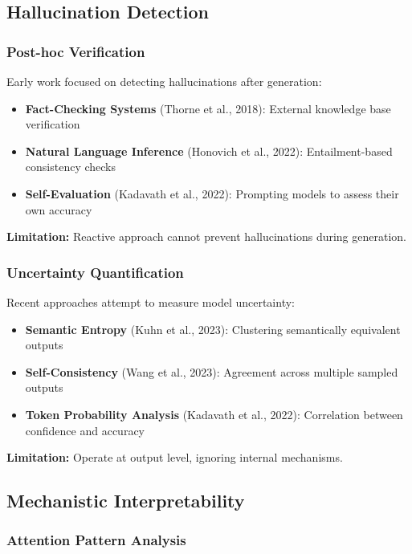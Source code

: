 \documentclass[11pt]{article}
\begin{document}
\subsection{Hallucination Detection}

\subsubsection{Post-hoc Verification}

Early work focused on detecting hallucinations after generation:

\begin{itemize}
    \item \textbf{Fact-Checking Systems} (Thorne et al., 2018): External knowledge base verification
    \item \textbf{Natural Language Inference} (Honovich et al., 2022): Entailment-based consistency checks
    \item \textbf{Self-Evaluation} (Kadavath et al., 2022): Prompting models to assess their own accuracy
\end{itemize}

\textbf{Limitation:} Reactive approach cannot prevent hallucinations during generation.

\subsubsection{Uncertainty Quantification}

Recent approaches attempt to measure model uncertainty:

\begin{itemize}
    \item \textbf{Semantic Entropy} (Kuhn et al., 2023): Clustering semantically equivalent outputs
    \item \textbf{Self-Consistency} (Wang et al., 2023): Agreement across multiple sampled outputs
    \item \textbf{Token Probability Analysis} (Kadavath et al., 2022): Correlation between confidence and accuracy
\end{itemize}

\textbf{Limitation:} Operate at output level, ignoring internal mechanisms.

\subsection{Mechanistic Interpretability}

\subsubsection{Attention Pattern Analysis}
\end{document}
